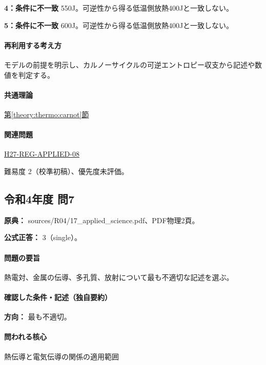 \noindent\textbf{4：条件に不一致} 550J。可逆性から得る低温側放熱400Jと一致しない。\par

\noindent\textbf{5：条件に不一致} 600J。可逆性から得る低温側放熱400Jと一致しない。\par

\paragraph{再利用する考え方} モデルの前提を明示し、カルノーサイクルの可逆エントロピー収支から記述や数値を判定する。

\paragraph{共通理論} \hyperref[theory:thermo:carnot]{第\ref*{theory:thermo:carnot}節}

\paragraph{関連問題} \hyperref[q:h27-reg-applied-08]{H27-REG-APPLIED-08}

\par 難易度 2（校準初稿）、優先度未評価。

\subsection{令和4年度 問7}
\label{q:r04-reg-applied-07}

\noindent\textbf{原典：} sources/R04/17\_applied\_science.pdf、PDF物理2頁。

\textbf{公式正答：} 3（single）。

\paragraph{問題の要旨} 熱電対、金属の伝導、多孔質、放射について最も不適切な記述を選ぶ。

\paragraph{確認した条件・記述（独自要約）}\mbox{}\par

\noindent\textbf{方向：} 最も不適切。\par

\paragraph{問われる核心} 熱伝導と電気伝導の関係の適用範囲

